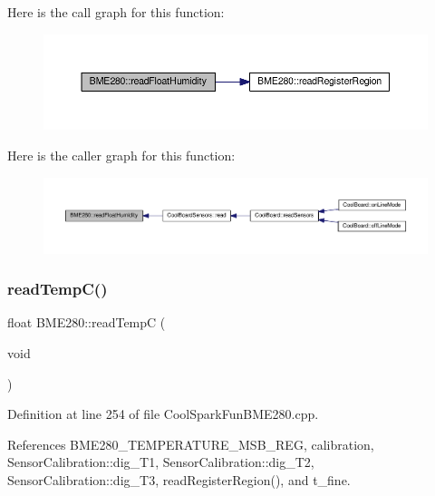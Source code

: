 Here is the call graph for this function\+:\nopagebreak
\begin{figure}[H]
\begin{center}
\leavevmode
\includegraphics[width=350pt]{df/dcf/class_b_m_e280_a42ea7232039eebf5aadb391ef6132c35_cgraph}
\end{center}
\end{figure}
Here is the caller graph for this function\+:\nopagebreak
\begin{figure}[H]
\begin{center}
\leavevmode
\includegraphics[width=350pt]{df/dcf/class_b_m_e280_a42ea7232039eebf5aadb391ef6132c35_icgraph}
\end{center}
\end{figure}
\mbox{\label{class_b_m_e280_afffdd1d7ded9e1f92200e70669019d97}} 
\subsubsection{\texorpdfstring{read\+Temp\+C()}{readTempC()}}
{\footnotesize\ttfamily float B\+M\+E280\+::read\+TempC (\begin{DoxyParamCaption}\item[{void}]{ }\end{DoxyParamCaption})}



Definition at line 254 of file Cool\+Spark\+Fun\+B\+M\+E280.\+cpp.



References B\+M\+E280\+\_\+\+T\+E\+M\+P\+E\+R\+A\+T\+U\+R\+E\+\_\+\+M\+S\+B\+\_\+\+R\+EG, calibration, Sensor\+Calibration\+::dig\+\_\+\+T1, Sensor\+Calibration\+::dig\+\_\+\+T2, Sensor\+Calibration\+::dig\+\_\+\+T3, read\+Register\+Region(), and t\+\_\+fine.




